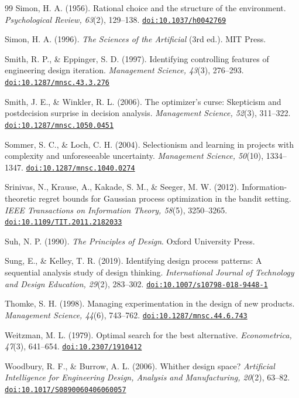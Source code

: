 \documentclass[10pt,twocolumn]{article}
\providecommand{\doi}[1]{\href{https://doi.org/#1}{\nolinkurl{doi:#1}}}
\theoremstyle{definition}
\begin{document}
\begin{thebibliography}{99}
 Simon, H. A. (1956). Rational choice and the structure of the environment. \textit{Psychological Review, 63}(2), 129--138. \doi{10.1037/h0042769}

 Simon, H. A. (1996). \textit{The Sciences of the Artificial} (3rd ed.). MIT Press.

 Smith, R. P., \& Eppinger, S. D. (1997). Identifying controlling features of engineering design iteration. \textit{Management Science, 43}(3), 276--293. \doi{10.1287/mnsc.43.3.276}

 Smith, J. E., \& Winkler, R. L. (2006). The optimizer's curse: Skepticism and postdecision surprise in decision analysis. \textit{Management Science, 52}(3), 311--322. \doi{10.1287/mnsc.1050.0451}

 Sommer, S. C., \& Loch, C. H. (2004). Selectionism and learning in projects with complexity and unforeseeable uncertainty. \textit{Management Science, 50}(10), 1334--1347. \doi{10.1287/mnsc.1040.0274}

 Srinivas, N., Krause, A., Kakade, S. M., \& Seeger, M. W. (2012). Information-theoretic regret bounds for Gaussian process optimization in the bandit setting. \textit{IEEE Transactions on Information Theory, 58}(5), 3250--3265. \doi{10.1109/TIT.2011.2182033}

 Suh, N. P. (1990). \textit{The Principles of Design}. Oxford University Press.

 Sung, E., \& Kelley, T. R. (2019). Identifying design process patterns: A sequential analysis study of design thinking. \textit{International Journal of Technology and Design Education, 29}(2), 283--302. \doi{10.1007/s10798-018-9448-1}

 Thomke, S. H. (1998). Managing experimentation in the design of new products. \textit{Management Science, 44}(6), 743--762. \doi{10.1287/mnsc.44.6.743}

 Weitzman, M. L. (1979). Optimal search for the best alternative. \textit{Econometrica, 47}(3), 641--654. \doi{10.2307/1910412}

 Woodbury, R. F., \& Burrow, A. L. (2006). Whither design space? \textit{Artificial Intelligence for Engineering Design, Analysis and Manufacturing, 20}(2), 63--82. \doi{10.1017/S0890060406060057}

\end{thebibliography}
\end{document}
